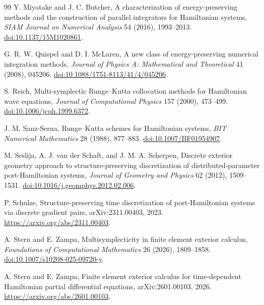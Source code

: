 \documentclass[11pt,a4paper]{article}
\begin{document}
\begin{thebibliography}{99}
Y. Miyatake and J. C. Butcher,
\newblock A characterization of energy-preserving methods and the
construction of parallel integrators for Hamiltonian systems,
\newblock \emph{SIAM Journal on Numerical Analysis} 54 (2016), 1993--2013.
\newblock \href{https://doi.org/10.1137/15M1020861}
{doi:10.1137/15M1020861}.

G. R. W. Quispel and D. I. McLaren,
\newblock A new class of energy-preserving numerical integration methods,
\newblock \emph{Journal of Physics A: Mathematical and Theoretical}
41 (2008), 045206.
\newblock \href{https://doi.org/10.1088/1751-8113/41/4/045206}
{doi:10.1088/1751-8113/41/4/045206}.

S. Reich,
\newblock Multi-symplectic Runge--Kutta collocation methods for Hamiltonian
wave equations,
\newblock \emph{Journal of Computational Physics} 157 (2000), 473--499.
\newblock \href{https://doi.org/10.1006/jcph.1999.6372}
{doi:10.1006/jcph.1999.6372}.

J. M. Sanz-Serna,
\newblock Runge--Kutta schemes for Hamiltonian systems,
\newblock \emph{BIT Numerical Mathematics} 28 (1988), 877--883.
\newblock \href{https://doi.org/10.1007/BF01954907}
{doi:10.1007/BF01954907}.

M. Seslija, A. J. van der Schaft, and J. M. A. Scherpen,
\newblock Discrete exterior geometry approach to structure-preserving
discretization of distributed-parameter port-Hamiltonian systems,
\newblock \emph{Journal of Geometry and Physics} 62 (2012), 1509--1531.
\newblock \href{https://doi.org/10.1016/j.geomphys.2012.02.006}
{doi:10.1016/j.geomphys.2012.02.006}.

P. Schulze,
\newblock Structure-preserving time discretization of port-Hamiltonian
systems via discrete gradient pairs,
\newblock arXiv:2311.00403, 2023.
\newblock \url{https://arxiv.org/abs/2311.00403}.

A. Stern and E. Zampa,
\newblock Multisymplecticity in finite element exterior calculus,
\newblock \emph{Foundations of Computational Mathematics} 26 (2026),
1809--1858.
\newblock \href{https://doi.org/10.1007/s10208-025-09720-y}
{doi:10.1007/s10208-025-09720-y}.

A. Stern and E. Zampa,
\newblock Finite element exterior calculus for time-dependent Hamiltonian
partial differential equations,
\newblock arXiv:2601.00103, 2026.
\newblock \url{https://arxiv.org/abs/2601.00103}.


\end{thebibliography}
\end{document}
